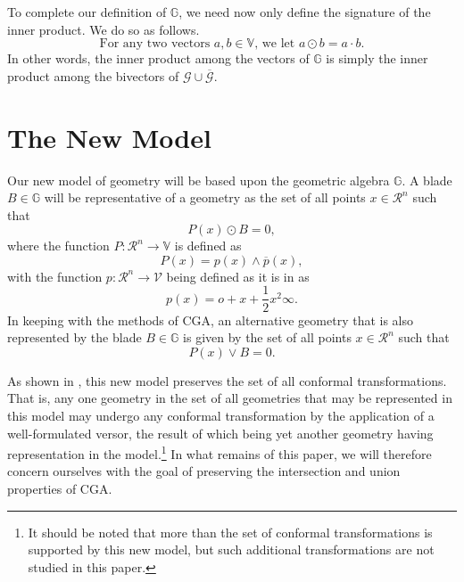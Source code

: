 \documentclass{birkjour}
\theoremstyle{definition}
\theoremstyle{remark}
\numberwithin{equation}{section}
\newcommand{\V}{\mathcal{V}}
\newcommand{\G}{\mathcal{G}}
\newcommand{\R}{\mathcal{R}}
\newcommand{\Gb}{\overline{\mathcal{G}}}
\newcommand{\VB}{\mathbb{V}}
\newcommand{\GB}{\mathbb{G}}
\newcommand{\nvao}{o}
\newcommand{\nvai}{\infty}
\begin{document}
To complete our definition of $\GB$, we need
now only define the signature of the inner product.  We do so as follows.
\begin{equation*}
\mbox{For any two vectors $a,b\in\VB$, we let $a\odot b=a\cdot b$.}
\end{equation*}
In other words, the inner product among the vectors of $\GB$ is simply the
inner product among the bivectors of $\G\cup\Gb$.

\section{The New Model}

Our new model of geometry will be based upon the geometric algebra $\GB$.
A blade $B\in\GB$ will be representative of a geometry as the set of
all points $x\in\R^n$ such that
\begin{equation*}
P(x)\odot B = 0,
\end{equation*}
where the function $P:\R^n\to\VB$ is defined as
\begin{equation*}
P(x) = p(x)\wedge\overline{p}(x),
\end{equation*}
with the function $p:\R^n\to\V$ being defined as it is in \cite{} as
\begin{equation*}
p(x) = \nvao + x + \frac{1}{2}x^2\nvai.
\end{equation*}
In keeping with the methods of CGA, an alternative geometry that is also
represented by the blade $B\in\GB$ is given by the set of all points $x\in\R^n$
such that
\begin{equation*}
P(x)\vee B = 0.
\end{equation*}

As shown in \cite{}, this new model preserves the set of all conformal
transformations.  That is, any one geometry in the set of all geometries that may be represented
in this model may undergo any conformal transformation by the application of a well-formulated
versor, the result of which
being yet another geometry having representation in the model.\footnote{It should be noted
that more than the set of conformal transformations is supported by this new model, but such
additional transformations are not studied in this paper.}
In what remains of this paper, we will therefore concern
ourselves with the goal of preserving the intersection and union properties of CGA.



\end{document}
